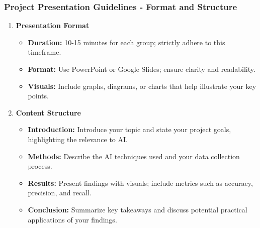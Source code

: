 \documentclass[aspectratio=169]{beamer}
\begin{document}
\begin{frame}[fragile]
    \frametitle{Project Presentation Guidelines - Format and Structure}
    \begin{enumerate}
        \item \textbf{Presentation Format}
            \begin{itemize}
                \item \textbf{Duration:} 10-15 minutes for each group; strictly adhere to this timeframe.
                \item \textbf{Format:} Use PowerPoint or Google Slides; ensure clarity and readability.
                \item \textbf{Visuals:} Include graphs, diagrams, or charts that help illustrate your key points.
            \end{itemize}

        \item \textbf{Content Structure}
            \begin{itemize}
                \item \textbf{Introduction:} Introduce your topic and state your project goals, highlighting the relevance to AI.
                \item \textbf{Methods:} Describe the AI techniques used and your data collection process.
                \item \textbf{Results:} Present findings with visuals; include metrics such as accuracy, precision, and recall.
                \item \textbf{Conclusion:} Summarize key takeaways and discuss potential practical applications of your findings.
            \end{itemize}
    \end{enumerate}
\end{frame}
\end{document}
